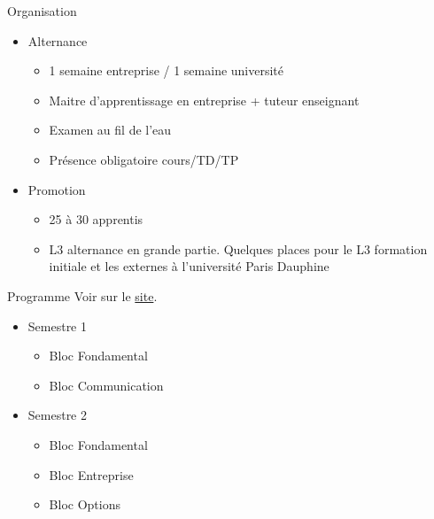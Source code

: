 \documentclass[minimal,compress]{beamer}
\begin{document}
\begin{frame}{Organisation}
\begin{itemize}
\item Alternance
\begin{itemize}
\item 1 semaine entreprise / 1 semaine université
\item 	Maitre d’apprentissage en entreprise + tuteur enseignant
\item 	Examen au fil de l’eau
\item 	Présence obligatoire cours/TD/TP

\end{itemize}
\item Promotion
\begin{itemize}
\item 25 à 30 apprentis
\item L3 alternance  en grande partie. Quelques places pour le L3 formation initiale et les externes à l’université Paris Dauphine
\end{itemize}
\end{itemize}
\end{frame}



\begin{frame}{Programme}
	Voir sur le \href{https://dauphine.psl.eu/formations/masters/informatique/m1-methodes-informatiques-appliquees-a-la-gestion-des-entreprises/formation}{site}.
	
	\begin{itemize}
		\item Semestre 1
		\begin{itemize}
			\item Bloc Fondamental
			\item Bloc Communication
		\end{itemize}
		\item Semestre 2
		\begin{itemize}
			\item Bloc Fondamental
			\item Bloc Entreprise
			\item Bloc Options
		\end{itemize}
	\end{itemize}
\end{frame}
\end{document}
